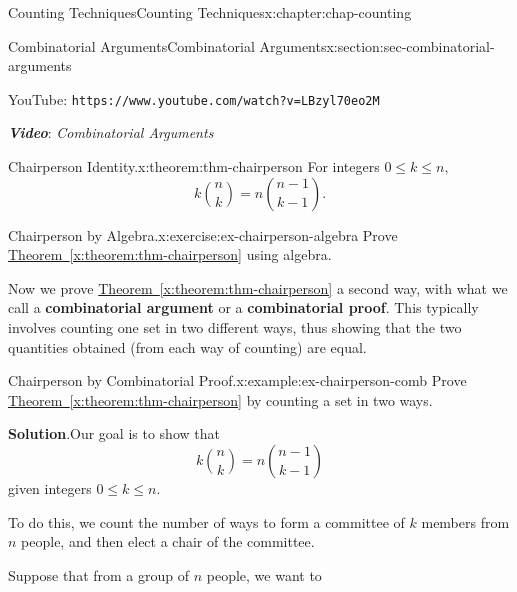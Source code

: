 \documentclass[oneside,10pt,]{book}
\newcommand{\blocktitlefont}{\relax}
\newcommand{\xreffont}{\relax}
\newcommand{\mono}[1]{\texttt{#1}}
\newcommand{\alert}[1]{\textbf{\textit{#1}}}
\newcommand{\terminology}[1]{\textbf{#1}}
\numberwithin{equation}{section}
\newlength{\qrsize}
\begin{document}
\begin{chapterptx}{Counting Techniques}{}{Counting Techniques}{}{}{x:chapter:chap-counting}
\begin{sectionptx}{Combinatorial Arguments}{}{Combinatorial Arguments}{}{}{x:section:sec-combinatorial-arguments}
\begin{sidebyside}{1}{0}{0}{0}
\begin{sbspanel}{1}
\begin{tcbraster}[raster columns=2, raster column skip=1pt, raster halign=center, raster force size=false, raster left skip=0pt, raster right skip=0pt]
\begin{tcolorbox}[qrstyle]
{\hypersetup{urlcolor=black}}%
\end{tcolorbox}%
\begin{tcolorbox}[captionstyle]%
\small YouTube: \mono{https://www.youtube.com/watch?v=LBzyl70eo2M}\end{tcolorbox}%
\end{tcbraster}%
\end{sbspanel}%
\end{sidebyside}%
\par
\alert{Video}: \emph{Combinatorial Arguments}%
\begin{theorem}{Chairperson Identity.}{}{x:theorem:thm-chairperson}%
For integers \(0 \leq k \leq n\),%
\begin{equation*}
k\binom{n}{k} = n\binom{n-1}{k-1}\text{.}
\end{equation*}
%
\end{theorem}
\begin{inlineexercise}{Chairperson by Algebra.}{x:exercise:ex-chairperson-algebra}%
Prove \hyperref[x:theorem:thm-chairperson]{Theorem~{\xreffont\ref{x:theorem:thm-chairperson}}} using algebra.%
\end{inlineexercise}
Now we prove \hyperref[x:theorem:thm-chairperson]{Theorem~{\xreffont\ref{x:theorem:thm-chairperson}}} a second way, with what we call a \terminology{combinatorial argument} or a \terminology{combinatorial proof}. This typically involves counting one set in two different ways, thus showing that the two quantities obtained (from each way of counting) are equal.%
\begin{example}{Chairperson by Combinatorial Proof.}{x:example:ex-chairperson-comb}%
Prove \hyperref[x:theorem:thm-chairperson]{Theorem~{\xreffont\ref{x:theorem:thm-chairperson}}} by counting a set in two ways.%
\par\smallskip%
\noindent\textbf{\blocktitlefont Solution}.\hypertarget{g:solution:id476892}{}\quad{}Our goal is to show that%
\begin{equation}
k\binom{n}{k} = n\binom{n-1}{k-1}\label{x:men:equation-chairperson}
\end{equation}
given integers \(0 \leq k \leq n\).%
\par
To do this, we count the number of ways to form a committee of \(k\) members from \(n\) people, and then elect a chair of the committee.%
\par
Suppose that from a group of \(n\) people, we want to%
\begin{enumerate}

\end{enumerate}
\end{example}
\end{sectionptx}
\end{chapterptx}
\end{document}
